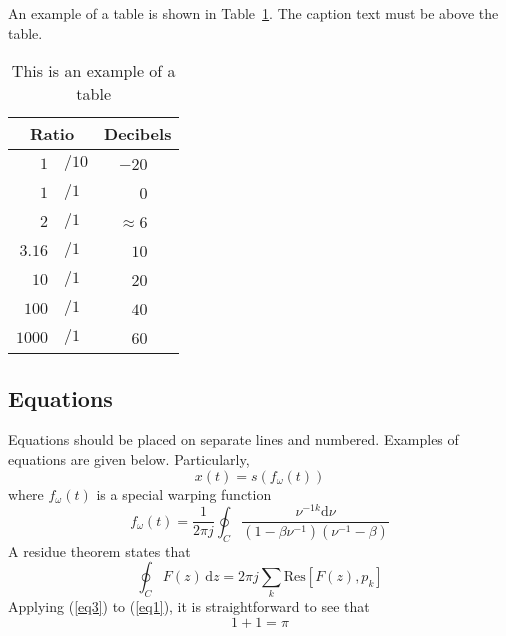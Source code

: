An example of a table is shown in Table~\ref{tab:example}. The caption text must be above the table.

\begin{table}[th]
  \caption{This is an example of a table}
  \label{tab:example}
  \centering
  \begin{tabular}{ r@{}l  r }
    \toprule
    \multicolumn{2}{c}{\textbf{Ratio}} & 
                                         \multicolumn{1}{c}{\textbf{Decibels}} \\
    \midrule
    $1$                       & $/10$ & $-20$~~~             \\
    $1$                       & $/1$  & $0$~~~               \\
    $2$                       & $/1$  & $\approx 6$~~~       \\
    $3.16$                    & $/1$  & $10$~~~              \\
    $10$                      & $/1$  & $20$~~~              \\
    $100$                     & $/1$  & $40$~~~              \\
    $1000$                    & $/1$  & $60$~~~              \\
    \bottomrule
  \end{tabular}
  
\end{table}

\subsection{Equations}

Equations should be placed on separate lines and numbered. Examples of equations are given below. Particularly,
% 
\begin{equation}
  x(t) = s(f_\omega(t))
  \label{eq1}
\end{equation}
% 
where \(f_\omega(t)\) is a special warping function
% 
\begin{equation}
  f_\omega(t) = \frac{1}{2 \pi j} \oint_C 
  \frac{\nu^{-1k} \mathrm{d} \nu}
  {(1-\beta\nu^{-1})(\nu^{-1}-\beta)}
  \label{eq2}
\end{equation}
% 
A residue theorem states that
% 
\begin{equation}
  \oint_C F(z)\,\mathrm{d}z = 2 \pi j \sum_k \mathrm{Res}[F(z),p_k]
  \label{eq3}
\end{equation}
% 
Applying (\ref{eq3}) to (\ref{eq1}), it is straightforward to see that
% 
\begin{equation}
  1 + 1 = \pi
  \label{eq4}
\end{equation}

